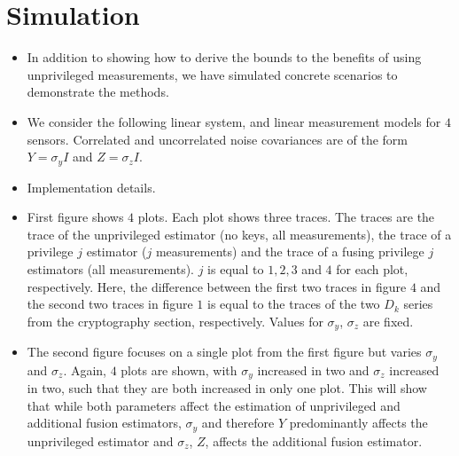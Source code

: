 \documentclass[conference]{IEEEtran}
\theoremstyle{definition}
\theoremstyle{remark}
\begin{document}
\section{Simulation}\label{sec:sim}
\begin{itemize}
  \item In addition to showing how to derive the bounds to the benefits of using unprivileged measurements, we have simulated concrete scenarios to demonstrate the methods.
  \item We consider the following linear system, and linear measurement models for $4$ sensors. Correlated and uncorrelated noise covariances are of the form $Y=\sigma_y I$ and $Z = \sigma_z I$.
  \item Implementation details.
  \item First figure shows $4$ plots. Each plot shows three traces. The traces are the trace of the unprivileged estimator (no keys, all measurements), the trace of a privilege $j$ estimator ($j$ measurements) and the trace of a fusing privilege $j$ estimators (all measurements). $j$ is equal to $1,2,3$ and $4$ for each plot, respectively. Here, the difference between the first two traces in figure $4$ and the second two traces in figure $1$ is equal to the traces of the two $D_k$ series from the cryptography section, respectively. Values for $\sigma_y$, $\sigma_z$ are fixed.
  \item The second figure focuses on a single plot from the first figure but varies $\sigma_y$ and $\sigma_z$. Again, $4$ plots are shown, with $\sigma_y$ increased in two and $\sigma_z$ increased in two, such that they are both increased in only one plot. This will show that while both parameters affect the estimation of unprivileged and additional fusion estimators, $\sigma_y$ and therefore $Y$ predominantly affects the unprivileged estimator and $\sigma_z$, $Z$, affects the additional fusion estimator.
\end{itemize}

% 
%                                               
%                                               
%                                               
% 
\end{document}
